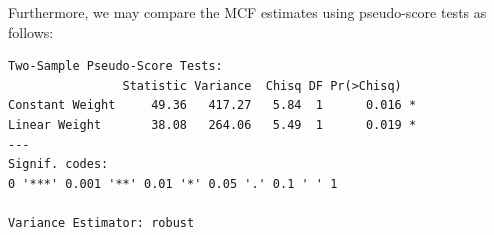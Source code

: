 Furthermore, we may compare the MCF estimates using pseudo-score tests
\citep{cook1996biometrics} as follows:

\begin{Shaded}
\begin{Highlighting}[]
\end{Highlighting}
\end{Shaded}

\begin{verbatim}
Two-Sample Pseudo-Score Tests:
                Statistic Variance  Chisq DF Pr(>Chisq)  
Constant Weight     49.36   417.27   5.84  1      0.016 *
Linear Weight       38.08   264.06   5.49  1      0.019 *
---
Signif. codes:  
0 '***' 0.001 '**' 0.01 '*' 0.05 '.' 0.1 ' ' 1

Variance Estimator: robust 
\end{verbatim}
